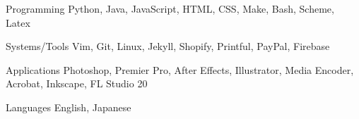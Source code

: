 

\begin{cvskills}

  \cvskill
    {Programming} %
    {Python, Java, JavaScript, HTML, CSS, Make, Bash, Scheme, Latex} %

  \cvskill
    {Systems/Tools} %
    {Vim, Git, Linux, Jekyll, Shopify, Printful, PayPal, Firebase} %

  \cvskill
    {Applications} %
    {Photoshop, Premier Pro, After Effects, Illustrator, Media Encoder, Acrobat,
	Inkscape, FL Studio 20} %

  \cvskill
    {Languages} %
    {English, Japanese} %

\end{cvskills}
